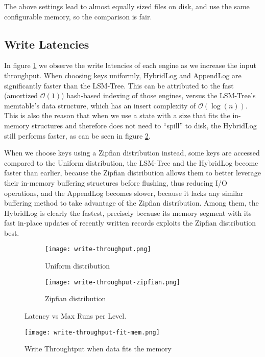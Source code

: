 The above settings lead to almost equally sized files on disk, and use the same configurable memory, so the comparison is fair.

\subsection{Write Latencies}

In figure \ref{fig:comparison-write} we observe the write latencies of each engine as we increase the input throughput. When choosing keys uniformly, HybridLog and AppendLog are significantly faster than the LSM-Tree. This can be attributed to the fast (amortized $\mathcal{O}(1)$) hash-based indexing of those engines, versus the LSM-Tree's memtable's data structure, which has an insert complexity of $\mathcal{O}(\log{}(n))$. This is also the reason that when we use a state with a size that fits the in-memory structures and therefore does not need to ``spill'' to disk, the HybridLog still performs faster, as can be seen in figure \ref{fig:comparison-write-fit-mem}.

When we choose keys using a Zipfian distribution instead, some keys are accessed compared to the Uniform distribution, the LSM-Tree and the HybridLog become faster than earlier, because the Zipfian distribution allows them to better leverage their in-memory buffering structures before flushing, thus reducing I/O operations, and the AppendLog becomes slower, because it lacks any similar buffering method to take advantage of the Zipfian distribution. Among them, the HybridLog is clearly the fastest, precisely because its memory segment with its fast in-place updates of recently written records exploits the Zipfian distribution best.


\begin{figure}[h]
    \begin{subfigure}{.5\textwidth}
        \centering
        \texttt{[image: write-throughput.png]}
        \caption{Uniform distribution}
    \end{subfigure}
    \begin{subfigure}{.5\textwidth}
        \centering
        \texttt{[image: write-throughput-zipfian.png]}
        \caption{Zipfian distribution}
    \end{subfigure}
    \caption{Latency vs Max Runs per Level.}
    \label{fig:comparison-write}
\end{figure}

\begin{figure}[h]
    \centering
    \texttt{[image: write-throughput-fit-mem.png]}
    \caption{Write Throughtput when data fits the memory}
    \label{fig:comparison-write-fit-mem}
\end{figure}

